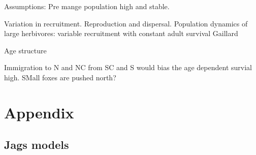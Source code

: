 \documentclass[PCJ,Unicode,screen]{cedram}
\begin{document}
Assumptions: Pre mange population high and stable.  

Variation in recruitment. Reproduction and dispersal. Population dynamics of large herbivores: variable recruitment with constant adult survival Gaillard

Age structure \citep{yonedaEffectsHuntingAge1982} 

Immigration to N and NC from SC and S would bias the age dependent survial high. SMall foxes are pushed north?  

\newpage
\singlespacing
\printbibliography

\newpage
\section*{Appendix}

\subsection*{Jags models}
\end{document}
